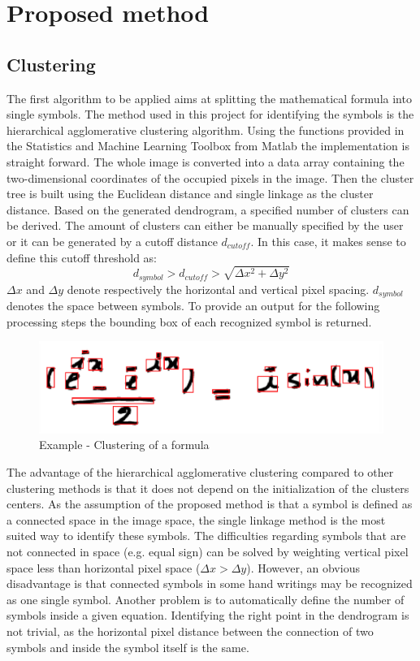 \documentclass[twocolumn]{article}%
\begin{document}
	    
	\section{Proposed method}
	\subsection{Clustering}
		The first algorithm to be applied aims at splitting the mathematical formula into single symbols. The method used in this project for identifying the symbols is the hierarchical agglomerative clustering algorithm. Using the functions provided in the Statistics and Machine Learning Toolbox from Matlab \cite{sml_matlab} the implementation is straight forward. The whole image is converted into a data array containing the two-dimensional coordinates of the occupied pixels in the image. Then the cluster tree is built using the Euclidean distance and single linkage as the cluster distance. Based on the generated dendrogram, a specified number of clusters can be derived. The amount of clusters can either be manually specified by the user or it can be generated by a cutoff distance $d_{cutoff}$. In this case, it makes sense to define this cutoff threshold as:
		\begin{equation}
		d_{symbol} > d_{cutoff} > \sqrt{\Delta x^2 + \Delta y^2}
		\end{equation}
		$\Delta x$ and $\Delta y$ denote respectively the horizontal and vertical pixel spacing. $d_{symbol}$ denotes the space between symbols. To provide an output for the following processing steps the bounding box of each recognized symbol is returned.
		
	\begin{figure}[htp]
	\centering
	\includegraphics[scale=0.31]{images/cluster.png}
	\caption{Example - Clustering of a formula}
	\end{figure}
	
			The advantage of the hierarchical agglomerative clustering compared to other clustering methods is that it does not depend on the initialization of the clusters centers. As the assumption of the proposed method is that a symbol is defined as a connected space in the image space, the single linkage method is the most suited way to identify these symbols. The difficulties regarding symbols that are not connected in space (e.g. equal sign) can be solved by weighting vertical pixel space less than horizontal pixel space ($\Delta x > \Delta y$). 
		However, an obvious disadvantage is that connected symbols in some hand writings may be recognized as one single symbol. Another problem is to automatically define the number of symbols inside a given equation. Identifying the right point in the dendrogram is not trivial, as the horizontal pixel distance between the connection of two symbols and inside the symbol itself is the same.
	
\end{document}

